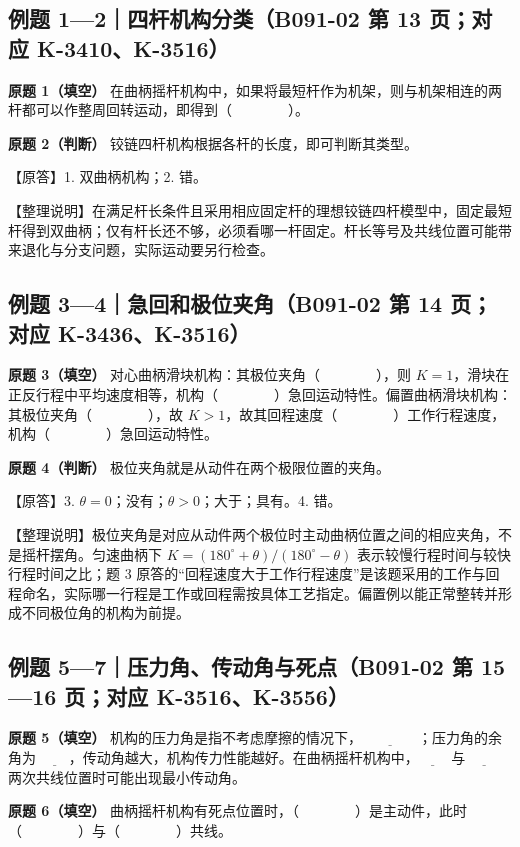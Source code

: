 \documentclass[zihao=5,a4paper,UTF8,fontset=fandol]{ctexart}
\begin{document}
\subsection{例题 1—2｜四杆机构分类（B091-02 第 13 页；对应 K-3410、K-3516）}

\textbf{原题 1（填空）} 在曲柄摇杆机构中，如果将最短杆作为机架，则与机架相连的两杆都可以作整周回转运动，即得到（　　　　）。


\textbf{原题 2（判断）} 铰链四杆机构根据各杆的长度，即可判断其类型。


【原答】1. 双曲柄机构；2. 错。


【整理说明】在满足杆长条件且采用相应固定杆的理想铰链四杆模型中，固定最短杆得到双曲柄；仅有杆长还不够，必须看哪一杆固定。杆长等号及共线位置可能带来退化与分支问题，实际运动要另行检查。


\subsection{例题 3—4｜急回和极位夹角（B091-02 第 14 页；对应 K-3436、K-3516）}

\textbf{原题 3（填空）} 对心曲柄滑块机构：其极位夹角（　　　　），则 $K=1$，滑块在正反行程中平均速度相等，机构（　　　　）急回运动特性。偏置曲柄滑块机构：其极位夹角（　　　　），故 $K>1$，故其回程速度（　　　　）工作行程速度，机构（　　　　）急回运动特性。


\textbf{原题 4（判断）} 极位夹角就是从动件在两个极限位置的夹角。


【原答】3. $\theta=0$；没有；$\theta>0$；大于；具有。4. 错。


【整理说明】极位夹角是对应从动件两个极位时主动曲柄位置之间的相应夹角，不是摇杆摆角。匀速曲柄下 $K=(180^\circ+\theta)/(180^\circ-\theta)$ 表示较慢行程时间与较快行程时间之比；题 3 原答的“回程速度大于工作行程速度”是该题采用的工作与回程命名，实际哪一行程是工作或回程需按具体工艺指定。偏置例以能正常整转并形成不同极位角的机构为前提。


\subsection{例题 5—7｜压力角、传动角与死点（B091-02 第 15—16 页；对应 K-3516、K-3556）}

\textbf{原题 5（填空）} 机构的压力角是指不考虑摩擦的情况下，$\underline{\qquad\qquad}$；压力角的余角为 $\underline{\qquad}$，传动角越大，机构传力性能越好。在曲柄摇杆机构中，$\underline{\qquad}$ 与 $\underline{\qquad}$ 两次共线位置时可能出现最小传动角。


\textbf{原题 6（填空）} 曲柄摇杆机构有死点位置时，（　　　　）是主动件，此时（　　　　）与（　　　　）共线。
\end{document}
